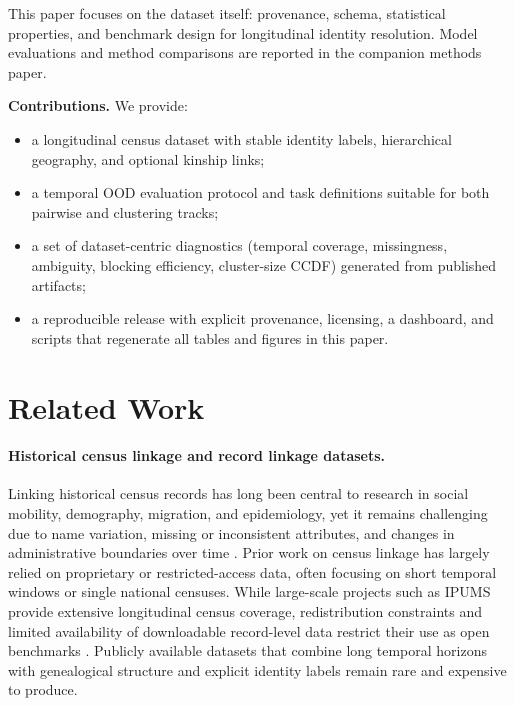 \documentclass{article}
\begin{document}
This paper focuses on the dataset itself: provenance, schema, statistical properties, and benchmark design for longitudinal identity resolution. Model evaluations and method comparisons are reported in the companion methods paper.

\textbf{Contributions.} We provide:
\begin{itemize}
    \item a longitudinal census dataset with stable identity labels, hierarchical geography, and optional kinship links;
    \item a temporal OOD evaluation protocol and task definitions suitable for both pairwise and clustering tracks;
    \item a set of dataset-centric diagnostics (temporal coverage, missingness, ambiguity, blocking efficiency, cluster-size CCDF) generated from published artifacts;
    \item a reproducible release with explicit provenance, licensing, a dashboard, and scripts that regenerate all tables and figures in this paper.
\end{itemize}



\section{Related Work}

\paragraph{Historical census linkage and record linkage datasets.}
Linking historical census records has long been central to research in social mobility, demography, migration, and epidemiology, yet it remains challenging due to name variation, missing or inconsistent attributes, and changes in administrative boundaries over time \cite{ruggles2018historical, Fellegi01121969, Newcombe1959AutomaticLO}. Prior work on census linkage has largely relied on proprietary or restricted-access data, often focusing on short temporal windows or single national censuses. While large-scale projects such as IPUMS provide extensive longitudinal census coverage, redistribution constraints and limited availability of downloadable record-level data restrict their use as open benchmarks \cite{sobek2011big, Sayers2015ProbabilisticRL}. Publicly available datasets that combine long temporal horizons with genealogical structure and explicit identity labels remain rare and expensive to produce.
\end{document}
